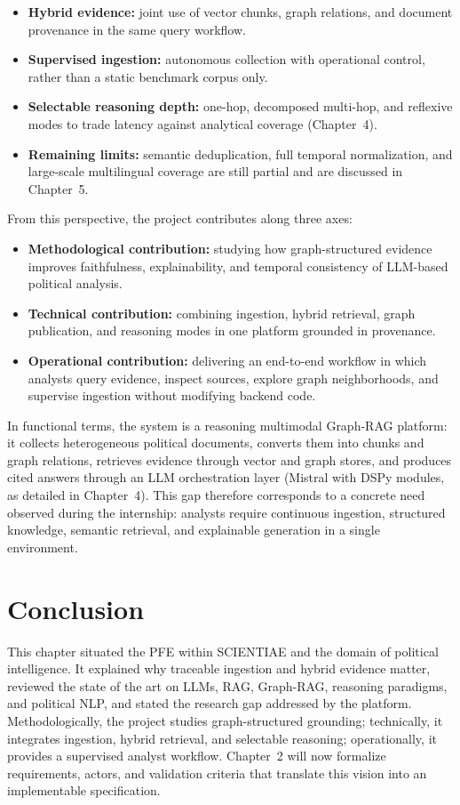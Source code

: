 \begin{itemize}[leftmargin=*, itemsep=4pt]
\item \textbf{Hybrid evidence:} joint use of vector chunks, graph relations, and document provenance in the same query workflow.
\item \textbf{Supervised ingestion:} autonomous collection with operational control, rather than a static benchmark corpus only.
\item \textbf{Selectable reasoning depth:} one-hop, decomposed multi-hop, and reflexive modes to trade latency against analytical coverage (Chapter~4).
\item \textbf{Remaining limits:} semantic deduplication, full temporal normalization, and large-scale multilingual coverage are still partial and are discussed in Chapter~5.
\end{itemize}

From this perspective, the project contributes along three axes:

\begin{itemize}[leftmargin=*, itemsep=4pt]
\item \textbf{Methodological contribution:} studying how graph-structured evidence improves faithfulness, explainability, and temporal consistency of LLM-based political analysis.
\item \textbf{Technical contribution:} combining ingestion, hybrid retrieval, graph publication, and reasoning modes in one platform grounded in provenance.
\item \textbf{Operational contribution:} delivering an end-to-end workflow in which analysts query evidence, inspect sources, explore graph neighborhoods, and supervise ingestion without modifying backend code.
\end{itemize}

In functional terms, the system is a reasoning multimodal Graph-RAG platform: it collects heterogeneous political documents, converts them into chunks and graph relations, retrieves evidence through vector and graph stores, and produces cited answers through an LLM orchestration layer (Mistral with DSPy modules, as detailed in Chapter~4). This gap therefore corresponds to a concrete need observed during the internship: analysts require continuous ingestion, structured knowledge, semantic retrieval, and explainable generation in a single environment.

\section{Conclusion}

This chapter situated the PFE within SCIENTIAE and the domain of political intelligence. It explained why traceable ingestion and hybrid evidence matter, reviewed the state of the art on LLMs, RAG, Graph-RAG, reasoning paradigms, and political NLP, and stated the research gap addressed by the platform. Methodologically, the project studies graph-structured grounding; technically, it integrates ingestion, hybrid retrieval, and selectable reasoning; operationally, it provides a supervised analyst workflow. Chapter~2 will now formalize requirements, actors, and validation criteria that translate this vision into an implementable specification.
